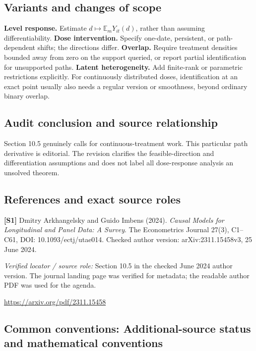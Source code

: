 \documentclass[11pt,a4paper]{article}
\begin{document}
\subsection*{Variants and changes of scope}

\textbf{Level response.} Estimate $d\mapsto\mathbb E_mY_{it}(d)$, rather than assuming differentiability. \textbf{Dose intervention.} Specify one-date, persistent, or path-dependent shifts; the directions differ. \textbf{Overlap.} Require treatment densities bounded away from zero on the support queried, or report partial identification for unsupported paths. \textbf{Latent heterogeneity.} Add finite-rank or parametric restrictions explicitly. For continuously distributed doses, identification at an exact point usually also needs a regular version or smoothness, beyond ordinary binary overlap.

\subsection*{Audit conclusion and source relationship}

Section 10.5 genuinely calls for continuous-treatment work. This particular path derivative is editorial. The revision clarifies the feasible-direction and differentiation assumptions and does not label all dose-response analysis an unsolved theorem.

\subsection*{References and exact source roles}

{\footnotesize\raggedright
\par\noindent\textbf{[S1]} Dmitry Arkhangelsky and Guido Imbens (2024). \emph{Causal Models for Longitudinal and Panel Data: A Survey}. The Econometrics Journal 27(3), C1--C61, DOI: 10.1093/ectj/utae014. Checked author version: arXiv:2311.15458v3, 25 June 2024.\par \textit{Verified locator / source role:} Section 10.5 in the checked June 2024 author version. The journal landing page was verified for metadata; the readable author PDF was used for the agenda.\par \url{https://arxiv.org/pdf/2311.15458}\par\smallskip
}

\subsection*{Common conventions: Additional-source status and mathematical conventions}
\end{document}
